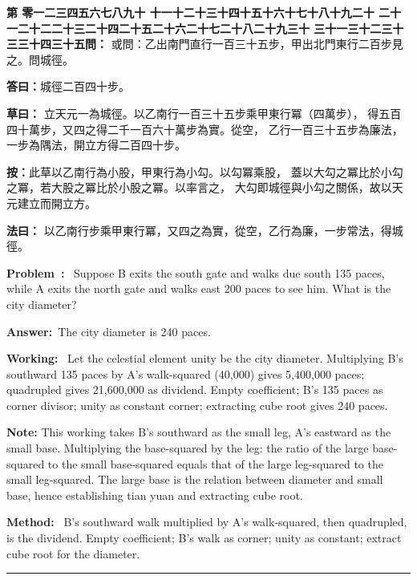 \documentclass[9pt,a4paper]{article}
\newcounter{probnum}
\newcounter{overallnum}
\newcommand{\chnum}[1]{%
  \ifcase#1 零\or 一\or 二\or 三\or 四\or 五\or 六\or 七\or 八\or 九\or 十\or
    十一\or 十二\or 十三\or 十四\or 十五\or 十六\or 十七\or 十八\or 十九\or 二十\or
    二十一\or 二十二\or 二十三\or 二十四\or 二十五\or 二十六\or 二十七\or 二十八\or 二十九\or 三十\or
    三十一\or 三十二\or 三十三\or 三十四\or 三十五\fi}
\newcommand{\problem}[1]{\stepcounter{probnum}\stepcounter{overallnum}\par\noindent\textbf{\color{volcolor}第\chnum{\value{probnum}}問：}#1\par\vspace{0.15cm}}
\newcommand{\answer}[1]{\par\noindent\textbf{答曰：}#1\par\vspace{0.15cm}}
\newcommand{\working}[1]{\par\noindent\textbf{草曰：}#1\par\vspace{0.15cm}}
\newcommand{\method}[1]{\par\noindent\textbf{法曰：}#1\par\vspace{0.25cm}}
\newcommand{\eproblem}[1]{\par\noindent\textbf{\color{volcolor}Problem~\theoverallnum:}~#1\par\vspace{0.15cm}}
\newcommand{\eanswer}[1]{\par\noindent\textbf{Answer:}~#1\par\vspace{0.15cm}}
\newcommand{\eworking}[1]{\par\noindent\textbf{Working:}~#1\par\vspace{0.15cm}}
\newcommand{\emethod}[1]{\par\noindent\textbf{Method:}~#1\par\vspace{0.25cm}}
\begin{document}
\noindent\begin{minipage}[t]{0.48\textwidth}
\problem{
或問：乙出南門直行一百三十五步，甲出北門東行二百步見之。問城徑。
}

\answer{城徑二百四十步。}

\working{
立天元一為城徑。以乙南行一百三十五步乘甲東行冪（四萬步），
得五百四十萬步，又四之得二千一百六十萬步為實。從空，
乙行一百三十五步為廉法，一步為隅法，開立方得二百四十步。

\textbf{按：}此草以乙南行為小股，甲東行為小勾。以勾冪乘股，
蓋以大勾之冪比於小勾之冪，若大股之冪比於小股之冪。以率言之，
大勾即城徑與小勾之關係，故以天元建立而開立方。
}

\method{
以乙南行步乘甲東行冪，又四之為實，從空，乙行為廉，一步常法，得城徑。
}
\end{minipage}%
\hfill%
\begin{minipage}[t]{0.50\textwidth}
\eproblem{
Suppose B exits the south gate and walks due south 135 paces, while A exits
the north gate and walks east 200 paces to see him. What is the city diameter?
}

\eanswer{The city diameter is 240 paces.}

\eworking{
Let the celestial element unity be the city diameter. Multiplying B's
southward 135 paces by A's walk-squared (40,000) gives 5,400,000 paces;
quadrupled gives 21,600,000 as dividend. Empty coefficient; B's 135 paces
as corner divisor; unity as constant corner; extracting cube root gives
240 paces.

\textbf{Note:} This working takes B's southward as the small leg, A's eastward
as the small base. Multiplying the base-squared by the leg: the ratio of
the large base-squared to the small base-squared equals that of the large
leg-squared to the small leg-squared. The large base is the relation between
diameter and small base, hence establishing tian yuan and extracting cube root.
}

\emethod{
B's southward walk multiplied by A's walk-squared, then quadrupled, is the
dividend. Empty coefficient; B's walk as corner; unity as constant;
extract cube root for the diameter.
}
\end{minipage}
\vspace{0.15cm}

\vspace{0.15cm}
\noindent\rule{\textwidth}{0.2pt}
\vspace{0.15cm}
\end{document}
